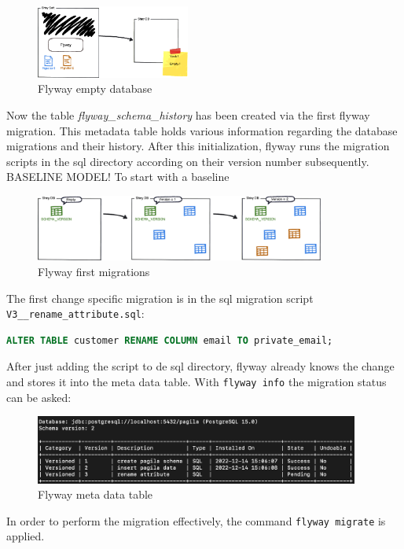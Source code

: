 \begin{figure}[H]
	\centering
	\includegraphics[width=0.45\textwidth]{./chapters/scenarios/images/EmptyDb}
	\caption[Flyway empty database - Source: \cite{FlywayGetStarted}]{Flyway empty database}
	 \label{fig:flyway_empty_db}
\end{figure}
Now the table \textit{flyway\_schema\_history} has been created via the first flyway migration. This metadata table holds various information regarding the database migrations and their history. After this initialization, flyway runs the migration scripts in the sql directory according on their version number subsequently. 
BASELINE MODEL! To start with a baseline

\begin{figure}[H]
	\centering
	\includegraphics[width=0.85\textwidth]{./chapters/scenarios/images/Migration-1-2}
	\caption[Flyway first migrations - Source: \cite{FlywayGetStarted}]{Flyway first migrations}
	\label{fig:Migration-1-2}
\end{figure}


%
The first change specific migration is in the sql migration script\\ \texttt{V3\_\_rename\_attribute.sql}:
\begin{lstlisting}[language=SQL]
ALTER TABLE customer RENAME COLUMN email TO private_email;
\end{lstlisting}
After just adding the script to de sql directory, flyway already knows the change and stores it into the meta data table. With \texttt{flyway info} the migration status can be asked:

\begin{figure}[H]
	\centering
	\includegraphics[width=0.95\textwidth]{./chapters/scenarios/images/flyway_metadata_v2}
	\caption[Flyway meta data table - Source: Own illustration]{Flyway meta data table}
\end{figure}
In order to perform the migration effectively, the command \texttt{flyway migrate} is applied.



